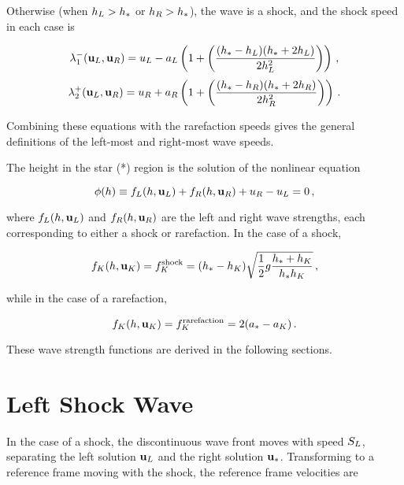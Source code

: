 Otherwise (when $h_L > h_*$ or $h_R > h_*$), the
wave is a shock, and the shock speed in each case is

\begin{equation}
  \lambda_1^-(\mathbf{u}_L, \mathbf{u}_R)
    = u_L - a_L\left(1 + \left(
    \frac{(h_* - h_L)(h_* + 2h_L)}{2h_L^2}\right)\right)
    \,,
\end{equation}
\begin{equation}
  \lambda_2^+(\mathbf{u}_L, \mathbf{u}_R)
    = u_R + a_R\left(1 + \left(
    \frac{(h_* - h_R)(h_* + 2h_R)}{2h_R^2}\right)\right)
    \,.
\end{equation}

Combining these equations with the rarefaction speeds gives the general
definitions of the left-most and right-most wave speeds.

The height in the star (*) region is the solution of the nonlinear equation

\begin{equation}
  \phi(h) \equiv
    f_L(h,\mathbf{u}_L) + f_R(h,\mathbf{u}_R)
    + u_R - u_L
    = 0 \,,
\end{equation}

where $f_L(h,\mathbf{u}_L)$ and $f_R(h,\mathbf{u}_R)$
are the left and right wave strengths, each corresponding to either a shock
or rarefaction. In the case of a shock,

\begin{equation}
  f_K(h,\mathbf{u}_K) = f_K^{\text{shock}} = 
    (h_* - h_K)\sqrt{\frac{1}{2}g\frac{h_* + h_K}
    {h_*h_K}}
    \,,
\end{equation}

while in the case of a rarefaction,

\begin{equation}
  f_K(h,\mathbf{u}_K) = f_K^{\text{rarefaction}} = 
    2(a_* - a_K)
    \,.
\end{equation}

These wave strength functions are derived in the following sections.

\section{Left Shock Wave}
In the case of a shock, the discontinuous wave front moves with speed
$S_L$, separating the left solution $\mathbf{u}_L$ and the right
solution $\mathbf{u}_*$. Transforming to a reference frame moving with the
shock, the reference frame velocities are

